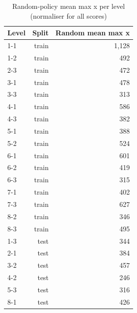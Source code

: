 \begin{table}[t]
\centering
\caption{Random-policy mean max x per level (normaliser for all scores)}
\label{tab:random_reference}
\begin{tabular}{lrr}
\toprule
Level & Split & Random mean max x \\
\midrule
1-1 & train & 1,128 \\
1-2 & train & 492 \\
2-3 & train & 472 \\
3-1 & train & 478 \\
3-3 & train & 313 \\
4-1 & train & 586 \\
4-3 & train & 382 \\
5-1 & train & 388 \\
5-2 & train & 524 \\
6-1 & train & 601 \\
6-2 & train & 419 \\
6-3 & train & 315 \\
7-1 & train & 402 \\
7-3 & train & 627 \\
8-2 & train & 346 \\
8-3 & train & 495 \\
1-3 & test & 344 \\
2-1 & test & 384 \\
3-2 & test & 457 \\
4-2 & test & 246 \\
5-3 & test & 316 \\
8-1 & test & 426 \\
\bottomrule
\end{tabular}
\end{table}
